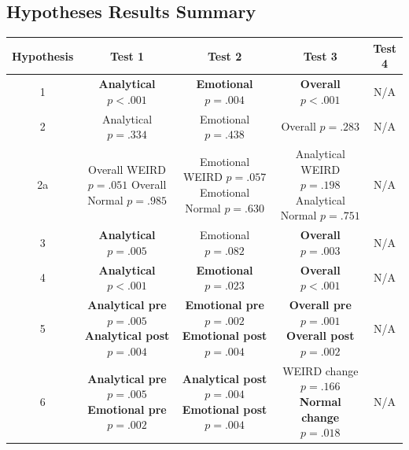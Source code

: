 \subsection{Hypotheses Results Summary}
\begin{tabular}{||c c c c c||} 
     \hline
     Hypothesis  & Test 1 & Test 2 & Test 3 & Test 4 \\ [0.5ex] 
     \hline\hline
     1 & \textbf{Analytical $p<.001$} & \textbf{Emotional $p=.004$} & \textbf{Overall $p<.001$} & N/A \\ 
     \hline
     2 & Analytical $p=.334$ & Emotional $p=.438$ & Overall $p=.283$ & N/A \\
     \hline
     2a & \makecell{Overall WEIRD $p=.051$ \\ Overall Normal $p=.985$} & \makecell{Emotional WEIRD $p=.057$ \\ Emotional Normal $p=.630$} & \makecell{Analytical WEIRD $p=.198$ \\ Analytical Normal $p=.751$} & N/A \\
     \hline
     3 & \textbf{Analytical $p=.005$} & Emotional $p=.082$ & \textbf{Overall $p=.003$} & N/A \\
     \hline
     4 & \textbf{Analytical $p<.001$} & \textbf{Emotional $p=.023$} & \textbf{Overall $p<.001$} & N/A \\
     \hline
     5 & \makecell{\textbf{Analytical pre $p=.005$} \\ \textbf{Analytical post $p=.004$}} & \makecell{\textbf{Emotional pre $p=.002$} \\ \textbf{Emotional post $p=.004$}} & \makecell{\textbf{Overall pre $p=.001$} \\ \textbf{Overall post $p=.002$}} & N/A \\ 
     \hline
     6 & \makecell{\textbf{Analytical pre $p=.005$} \\ \textbf{Emotional pre $p=.002$}} & \makecell{\textbf{Analytical post $p=.004$} \\ \textbf{Emotional post $p=.004$}} & \makecell{WEIRD change $p=.166$ \\ \textbf{Normal change $p=.018$}} & N/A \\ [1ex] 
     \hline
\end{tabular}